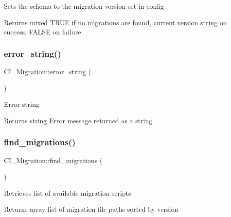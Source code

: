 Sets the schema to the migration version set in config

\begin{DoxyReturn}{Returns}
mixed T\+R\+UE if no migrations are found, current version string on success, F\+A\+L\+SE on failure 
\end{DoxyReturn}
\mbox{\label{class_c_i___migration_a7193a5ae6e8b8bca3c650a0d303048ae}} 
\subsubsection{\texorpdfstring{error\+\_\+string()}{error\_string()}}
{\footnotesize\ttfamily C\+I\+\_\+\+Migration\+::error\+\_\+string (\begin{DoxyParamCaption}{ }\end{DoxyParamCaption})}

Error string

\begin{DoxyReturn}{Returns}
string Error message returned as a string 
\end{DoxyReturn}
\mbox{\label{class_c_i___migration_a6b8d3ea8c75abaf3e604f89c144004ac}} 
\subsubsection{\texorpdfstring{find\+\_\+migrations()}{find\_migrations()}}
{\footnotesize\ttfamily C\+I\+\_\+\+Migration\+::find\+\_\+migrations (\begin{DoxyParamCaption}{ }\end{DoxyParamCaption})}

Retrieves list of available migration scripts

\begin{DoxyReturn}{Returns}
array list of migration file paths sorted by version 
\end{DoxyReturn}
\mbox{\label{class_c_i___migration_aef344b95c0ed720a63f2ae364e0f605d}} 
